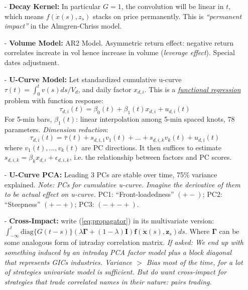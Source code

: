 \documentclass[9pt, landscape]{article}
\begin{document}
\begin{multicols*}{3}
\begin{itemize}
\begin{itemize}[leftmargin=10pt,noitemsep,topsep=0pt,partopsep=0pt]
		\begin{equation}\label{eq:propagator}
		P^x(t) = P^0(t) + \int_{-\infty}^t f(\dot{x}(s), z_s) G(t-s) ds + h(\dot{x}(t), z_t)
		\end{equation}
		Sum of 3 things: unaffected price, transient impact (spread, financing cost, etc), and convolution of the instantaneous impact of \textit{all} child orders before $t$ with a decay kernel $G$.
		\item[-] \textbf{Decay Kernel:} In particular $G=1$, the convolution will be linear in $t$, which means $f(\dot{x}(s), z_s)$ stacks on price permanently. This is \textit{``permanent impact''} in the Almgren-Chriss model.
		\item[-] \textbf{Volume Model:} AR2 Model. Asymmetric return effect: negative return correlates increate in vol hence increase in volume (\textit{leverage effect}). Special dates adjustment.
		\item[-] \textbf{U-Curve Model:} Let standardized cumulative u-curve $\tau(t) = \int_0^t v(s)ds / V_d$, and daily factor $x_{d,i}$. This is a \textit{\href{https://en.wikipedia.org/wiki/Functional_regression}{functional regression}} problem with function response:
		$$
		\tau_{d,i}(t) = \beta_{0} (t) + \beta_1(t) x_{d,i} + u_{d,i}(t)
		$$
		For 5-min bars, $\beta_1(t)$: linear interpolation among 5-min spaced knots, 78 parameters. \textit{Dimension reduction}:
		$$
		\tau_{d,i}(t)  = \bar{\tau}(t) + s_{d,i,1}v_1(t) + ... + s_{d,i,k}v_k(t) + u_{d,i}(t)
		$$
		where $v_1(t), ..., v_k(t)$ are PC directions. It then suffices to estimate $s_{d,i,k} = \beta_{k} x_{d, i} + \epsilon_{d,i,k}$, i.e. the relationship between factors and PC scores.
		\item[-] \textbf{U-Curve PCA:} Leading 3 PCs are stable over time, 75\% variance explained. \textit{Note: PCs for cumulative u-curve. Imagine the derivative of them to be actual effect on u-curve.} PC1: ``Front-loadedness'' $(+-)$; PC2: ``Steepness'' $(+-+)$; PC3: $(-+-+)$.
		\item[-] \textbf{Cross-Impact:} write (\ref{eq:propagator}) in its multivariate version: $\int_{-\infty}^t \text{diag}\{G(t-s)\} (\lambda\bm{\Gamma} + (1- \lambda)\bm{I}) \bm{f}(\dot{\bm{x}}(s), \bm{z}_s) ds$. Where $\bm{\Gamma}$ can be some analogous form of intraday correlation matrix. \textit{If asked: We end up with something induced by an intraday PCA factor model plus a block diagonal that represents GICs industries. Variance $>$ Bias most of the time, for a lot of strategies univariate model is sufficient. But do want cross-impact for strategies that trade correlated names in their nature: pairs trading.}

\end{itemize}
\end{itemize}
\end{multicols*}
\end{document}
